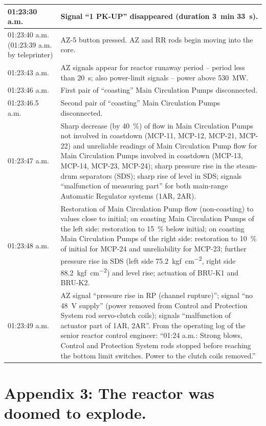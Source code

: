 \documentclass[openright]{bookest}
\begin{document}
\begin{center}
\begin{longtable}{|p{6em}|p{27em}|}
    01:23:30 a.m. & Signal ``1 PK-UP'' disappeared (duration 3~min 33~s). \\ \hline
    01:23:40 a.m. (01:23:39 a.m. by teleprinter) & AZ-5 button pressed. AZ and RR rods begin moving into the core. \\ \hline
    01:23:43 a.m. & AZ signals appear for reactor runaway period -- period less than \qty{20}{\second}; also power-limit signals -- power above \qty{530}{\mega\watt}. \\ \hline
    01:23:46 a.m. & First pair of ``coasting'' Main Circulation Pumps disconnected. \\ \hline
    01:23:46.5 a.m. & Second pair of ``coasting'' Main Circulation Pumps disconnected. \\ \hline
    01:23:47 a.m. & Sharp decrease (by \qty{40}{\percent}) of flow in Main Circulation Pumps not involved in coastdown (MCP-11, MCP-12, MCP-21, MCP-22) and unreliable readings of Main Circulation Pump flow for Main Circulation Pumps involved in coastdown (MCP-13, MCP-14, MCP-23, MCP-24); sharp pressure rise in the steam-drum separators (SDS); sharp rise of level in SDS; signals ``malfunction of measuring part'' for both main-range Automatic Regulator systems (1AR, 2AR). \\ \hline
    01:23:48 a.m. & Restoration of Main Circulation Pump flow (non-coasting) to values close to initial; on coasting Main Circulation Pumps of the left side: restoration to \qty{15}{\percent} below initial; on coasting Main Circulation Pumps of the right side: restoration to \qty{10}{\percent} of initial for MCP-24 and unreliability for MCP-23; further pressure rise in SDS (left side \qty{75.2}{kgf\per\centi\metre\squared}, right side \qty{88.2}{kgf\per\centi\metre\squared}) and level rise; actuation of BRU-K1 and BRU-K2.\\ \hline
    01:23:49 a.m. & AZ signal ``pressure rise in RP (channel rupture)''; signal ``no \qty{48}{\volt} supply'' (power removed from Control and Protection System rod servo-clutch coils); signals ``malfunction of actuator part of 1AR, 2AR''. From the operating log of the senior reactor control engineer: ``01:24 a.m.: Strong blows, Control and Protection System rods stopped before reaching the bottom limit switches. Power to the clutch coils removed.'' \\
    \hline
  \end{longtable}
\end{center}\normalsize

\chapter*{Appendix 3: The reactor was doomed to explode.}
\end{document}
